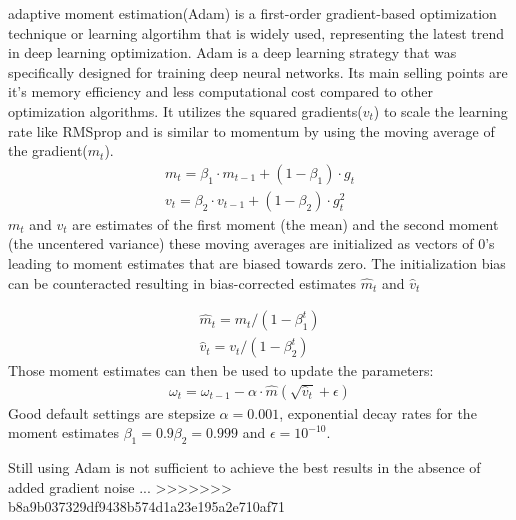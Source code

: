 \documentclass[
a4paper, 
12pt,
grayscalebody, %
abstract=on,
twoside, BCOR10mm, 12pt, DIV13,headinclude, footexclude, final, abstracton, openright
]{ibireprt}
\numberwithin{equation}{chapter}
\numberwithin{table}{chapter}
\numberwithin{figure}{chapter}
\numberwithin{algorithm}{chapter}
\numberwithin{example}{chapter}
\numberwithin{example}{chapter}
\begin{document}
adaptive moment estimation(Adam)\cite{Kingma2014} is a first-order gradient-based optimization technique or learning algortihm that is widely used, representing the latest trend in deep learning optimization. Adam is a deep learning strategy that was specifically designed for training deep neural networks. Its main selling points are it's memory efficiency and less computational cost compared to other optimization algorithms. It  utilizes the squared gradients($v_t$) to scale the learning rate like RMSprop and  is similar to momentum by using the moving average of the gradient($m_t$).%
\begin{align}
	m_t =\beta_1\cdot m_{t-1} + (1- \beta_1)\cdot g_t \\
	v_t =\beta_2\cdot v_{t-1} + (1- \beta_2)\cdot g_t^2
\end{align}
$m_t$ and $v_t$ are estimates of the first moment (the mean) and the second moment (the uncentered
variance) these moving averages are initialized as vectors of 0's leading to moment estimates that are  biased towards zero. The initialization bias can be counteracted resulting in bias-corrected estimates $\hat{m}_t$ and $\hat{v}_t$

\begin{align}
		\hat{m}_t = m_t/(1- \beta_1^t)\\
	\hat{v}_t = v_t/(1- \beta_2^t)
\end{align}
Those moment estimates can then be used to update the parameters: 
\begin{align}
	\omega_t = \omega_{t-1}-\alpha\cdot\hat{m}(\sqrt{\hat{v}_t}+\epsilon)
\end{align}
Good default settings are stepsize $\alpha = 0.001$, exponential decay rates for the moment estimates $\beta_1 = 0.9 \beta_2 = 0.999 $ and $\epsilon =  10^{-10}$.



Still using Adam is not sufficient to achieve the best results in the absence of added gradient noise \cite{Neelakantan2015}...%
>>>>>>> b8a9b037329df9438b574d1a23e195a2e710af71
\end{document}
